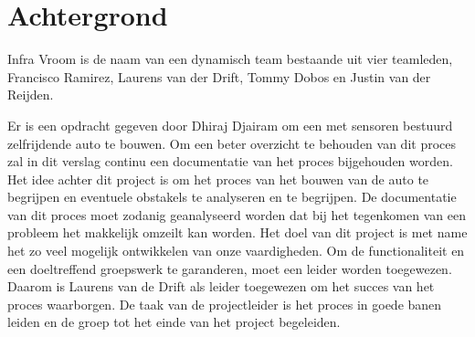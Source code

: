 \section{Achtergrond}
Infra Vroom is de naam van een dynamisch team bestaande uit vier teamleden, Francisco Ramirez, Laurens van der Drift, Tommy Dobos en Justin van der Reijden.

Er is een opdracht gegeven door Dhiraj Djairam om een met sensoren bestuurd zelfrijdende auto te bouwen. Om een beter overzicht te behouden van dit proces zal in dit verslag continu een documentatie van het proces bijgehouden worden. Het idee achter dit project is om het proces van het bouwen van de auto te begrijpen en eventuele obstakels te analyseren en te begrijpen. De documentatie van dit proces moet zodanig geanalyseerd worden dat bij het tegenkomen van een probleem het makkelijk omzeilt kan worden. Het doel van dit project is met name het zo veel mogelijk ontwikkelen van onze vaardigheden. Om de functionaliteit en een doeltreffend groepswerk te garanderen, moet een leider worden toegewezen. Daarom is Laurens van de Drift als leider toegewezen om het succes van het proces waarborgen. De taak van de projectleider is het proces in goede banen leiden en de groep tot het einde van het project begeleiden.
